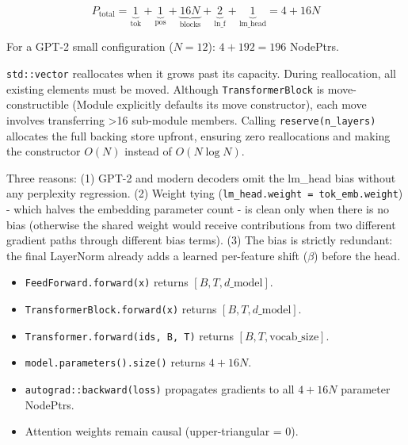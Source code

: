 \documentclass[12pt, a4paper]{article}
\begin{document}
\[
  P_{\text{total}} = \underbrace{1}_{\text{tok}} + \underbrace{1}_{\text{pos}}
  + \underbrace{16N}_{\text{blocks}} + \underbrace{2}_{\text{ln\_f}}
  + \underbrace{1}_{\text{lm\_head}}
  = 4 + 16N
\]

For a GPT-2 small configuration (\(N=12\)): \(4 + 192 = 196\) NodePtrs.

\begin{tcolorbox}[interviewbox,
    title={Interview: Why use blocks.reserve(n\_layers) before emplace\_back?}]
  \texttt{std::vector} reallocates when it grows past its capacity.  During
  reallocation, all existing elements must be moved.  Although
  \texttt{TransformerBlock} is move-constructible (Module explicitly defaults
  its move constructor), each move involves transferring \textgreater 16
  sub-module members.  Calling \texttt{reserve(n\_layers)} allocates the full
  backing store upfront, ensuring zero reallocations and making the constructor
  \(O(N)\) instead of \(O(N \log N)\).
\end{tcolorbox}

\begin{tcolorbox}[interviewbox,
    title={Interview: Why does lm\_head have no bias?}]
  Three reasons: (1) GPT-2 and modern decoders omit the lm\_head bias without
  any perplexity regression.  (2) Weight tying (\texttt{lm\_head.weight =
  tok\_emb.weight}) - which halves the embedding parameter count - is clean
  only when there is no bias (otherwise the shared weight would receive
  contributions from two different gradient paths through different bias terms).
  (3) The bias is strictly redundant: the final LayerNorm already adds a
  learned per-feature shift (\(\beta\)) before the head.
\end{tcolorbox}

\begin{tcolorbox}[exitbox, title={Step 2.4 - Exit Criterion (met)}]
  \begin{itemize}
    \item \texttt{FeedForward.forward(x)} returns \([B,T,d\_\text{model}]\). \checkmark
    \item \texttt{TransformerBlock.forward(x)} returns \([B,T,d\_\text{model}]\). \checkmark
    \item \texttt{Transformer.forward(ids, B, T)} returns \([B,T,\text{vocab\_size}]\). \checkmark
    \item \texttt{model.parameters().size()} returns \(4 + 16N\). \checkmark
    \item \texttt{autograd::backward(loss)} propagates gradients
          to all \(4+16N\) parameter NodePtrs. \checkmark
    \item Attention weights remain causal (upper-triangular = 0). \checkmark
  \end{itemize}
\end{tcolorbox}
\end{document}
